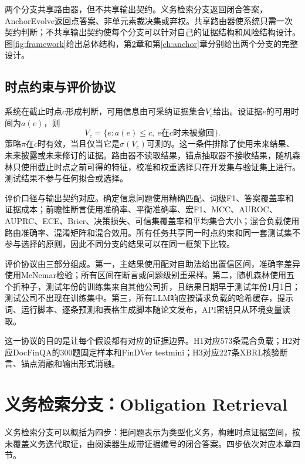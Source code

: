 两个分支共享路由器，但不共享输出契约。义务检索分支返回闭合答案，AnchorEvolve返回点答案、非单元素裁决集或弃权。共享路由器使系统只需一次契约判断；不共享输出契约使每个分支可以针对自己的证据结构和风险结构设计。图\ref{fig:framework}给出总体结构，第\ref{ch:determinate}章和第\ref{ch:anchor}章分别给出两个分支的完整设计。



\section{时点约束与评价协议}

系统在截止时点$c$形成判断，可用信息由可采纳证据集合$V_c$给出。设证据$e$的可用时间为$a(e)$，则
\begin{equation}
V_c=\{e:a(e)\le c,\ e\text{在}c\text{时未被撤回}\}.
\end{equation}
策略$\pi$在$c$时有效，当且仅当它是$\sigma(V_c)$可测的。这一条件排除了使用未来结果、未来披露或未来修订的证据。路由器不读取结果，锚点抽取器不接收结果，随机森林只使用截止时点之前可得的特征，校准和权重选择只在开发集与验证集上进行。测试结果不参与任何拟合或选择。

评价口径与输出契约对应。确定信息问题使用精确匹配、词级F1、答案覆盖率和证据成本；前瞻性断言使用准确率、平衡准确率、宏F1、MCC、AUROC、AUPRC、ECE、Brier、决策损失、可信集覆盖率和平均集合大小；混合负载使用路由准确率、混淆矩阵和混合效用。所有任务共享同一时点约束和同一套测试集不参与选择的原则，因此不同分支的结果可以在同一框架下比较。

评价协议由三部分组成。第一，主结果使用配对自助法给出置信区间，准确率差异使用McNemar检验；所有区间在断言或问题级别重采样。第二，随机森林使用五个折种子，测试年份的训练集来自其他公司折，且结果日期早于测试年份1月1日；测试公司不出现在训练集中。第三，所有LLM响应按请求负载的哈希缓存，提示词、运行脚本、逐条预测和表格生成脚本随论文发布，API密钥只从环境变量读取。

这一协议的目的是让每个假设都有对应的证据边界。H1对应573条混合负载；H2对应DocFinQA的300题固定样本和FinDVer testmini；H3对应227条XBRL核验断言、锚点消融和输出形式消融。

\chapter{义务检索分支：Obligation Retrieval}
\label{ch:determinate}

义务检索分支可以概括为四步：把问题表示为类型化义务，构建时点证据空间，按未覆盖义务迭代取证，由阅读器生成带证据编号的闭合答案。四步依次对应本章四节。

